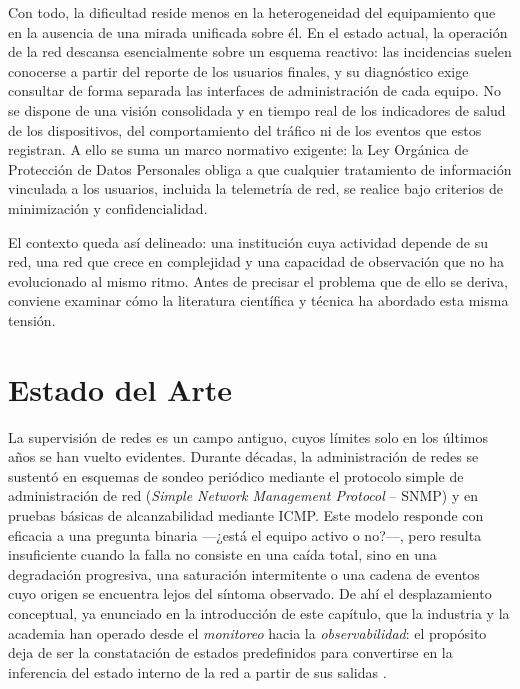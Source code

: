 Con todo, la dificultad reside menos en la heterogeneidad del equipamiento que en la ausencia de una mirada unificada sobre él. En el estado actual, la operación de la red descansa esencialmente sobre un esquema reactivo: las incidencias suelen conocerse a partir del reporte de los usuarios finales, y su diagnóstico exige consultar de forma separada las interfaces de administración de cada equipo. No se dispone de una visión consolidada y en tiempo real de los indicadores de salud de los dispositivos, del comportamiento del tráfico ni de los eventos que estos registran. A ello se suma un marco normativo exigente: la Ley Orgánica de Protección de Datos Personales \cite{lopdp2021} obliga a que cualquier tratamiento de información vinculada a los usuarios, incluida la telemetría de red, se realice bajo criterios de minimización y confidencialidad.

El contexto queda así delineado: una institución cuya actividad depende de su red, una red que crece en complejidad y una capacidad de observación que no ha evolucionado al mismo ritmo. Antes de precisar el problema que de ello se deriva, conviene examinar cómo la literatura científica y técnica ha abordado esta misma tensión.

\section{Estado del Arte}
\label{sec:estado_del_arte}

La supervisión de redes es un campo antiguo, cuyos límites solo en los últimos años se han vuelto evidentes. Durante décadas, la administración de redes se sustentó en esquemas de sondeo periódico mediante el protocolo simple de administración de red (\textit{Simple Network Management Protocol} -- SNMP) y en pruebas básicas de alcanzabilidad mediante ICMP. Este modelo responde con eficacia a una pregunta binaria ---¿está el equipo activo o no?---, pero resulta insuficiente cuando la falla no consiste en una caída total, sino en una degradación progresiva, una saturación intermitente o una cadena de eventos cuyo origen se encuentra lejos del síntoma observado. De ahí el desplazamiento conceptual, ya enunciado en la introducción de este capítulo, que la industria y la academia han operado desde el \textit{monitoreo} hacia la \textit{observabilidad}: el propósito deja de ser la constatación de estados predefinidos para convertirse en la inferencia del estado interno de la red a partir de sus salidas \cite{majors2022observability}.

